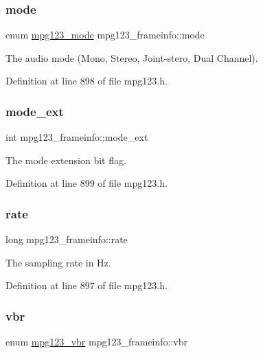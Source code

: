 \mbox{\label{structmpg123__frameinfo_a2d4adb8ca9bd6dc0de36c8dca3fe531d}} 
\subsubsection{\texorpdfstring{mode}{mode}}
{\footnotesize\ttfamily enum \mbox{\hyperlink{group__mpg123__status_ga044931724a9a987a86c2eea02f85cc4b}{mpg123\+\_\+mode}} mpg123\+\_\+frameinfo\+::mode}

The audio mode (Mono, Stereo, Joint-\/stero, Dual Channel). 

Definition at line 898 of file mpg123.\+h.

\mbox{\label{structmpg123__frameinfo_ad9c559387cf061d05384b4c204cd0e97}} 
\subsubsection{\texorpdfstring{mode\_ext}{mode\_ext}}
{\footnotesize\ttfamily int mpg123\+\_\+frameinfo\+::mode\+\_\+ext}

The mode extension bit flag. 

Definition at line 899 of file mpg123.\+h.

\mbox{\label{structmpg123__frameinfo_ab0e716a76ae87991e4607e5803da6899}} 
\subsubsection{\texorpdfstring{rate}{rate}}
{\footnotesize\ttfamily long mpg123\+\_\+frameinfo\+::rate}

The sampling rate in Hz. 

Definition at line 897 of file mpg123.\+h.

\mbox{\label{structmpg123__frameinfo_a48708817882f58b0a32c1e9db6e9fd74}} 
\subsubsection{\texorpdfstring{vbr}{vbr}}
{\footnotesize\ttfamily enum \mbox{\hyperlink{group__mpg123__status_ga8253714e77705037271f377f33858876}{mpg123\+\_\+vbr}} mpg123\+\_\+frameinfo\+::vbr}

